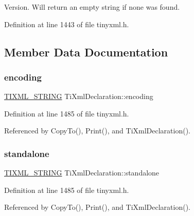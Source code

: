 Version. Will return an empty string if none was found. 



Definition at line 1443 of file tinyxml.\+h.



\subsection{Member Data Documentation}
\hypertarget{class_ti_xml_declaration_a24b8645d7696ec169bbb3fb7d30860cf}{}\label{class_ti_xml_declaration_a24b8645d7696ec169bbb3fb7d30860cf} 
\subsubsection{\texorpdfstring{encoding}{encoding}}
{\footnotesize\ttfamily \hyperlink{tinyxml_8h_a92bada05fd84d9a0c9a5bbe53de26887}{T\+I\+X\+M\+L\+\_\+\+S\+T\+R\+I\+NG} Ti\+Xml\+Declaration\+::encoding\hspace{0.3cm}{\ttfamily [private]}}



Definition at line 1485 of file tinyxml.\+h.



Referenced by Copy\+To(), Print(), and Ti\+Xml\+Declaration().

\hypertarget{class_ti_xml_declaration_a52524bf1a0726104350fe4121d7fdff4}{}\label{class_ti_xml_declaration_a52524bf1a0726104350fe4121d7fdff4} 
\subsubsection{\texorpdfstring{standalone}{standalone}}
{\footnotesize\ttfamily \hyperlink{tinyxml_8h_a92bada05fd84d9a0c9a5bbe53de26887}{T\+I\+X\+M\+L\+\_\+\+S\+T\+R\+I\+NG} Ti\+Xml\+Declaration\+::standalone\hspace{0.3cm}{\ttfamily [private]}}



Definition at line 1485 of file tinyxml.\+h.



Referenced by Copy\+To(), Print(), and Ti\+Xml\+Declaration().

\hypertarget{class_ti_xml_declaration_ab9eb14dc9cb78e3a8a0636d5d6a5d04d}{}\label{class_ti_xml_declaration_ab9eb14dc9cb78e3a8a0636d5d6a5d04d} 
